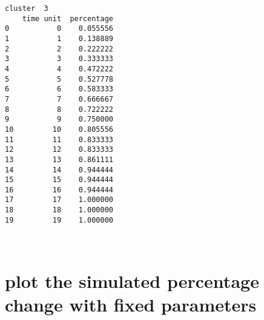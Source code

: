 \documentclass[11pt]{article}
\begin{document}
\begin{Verbatim}[commandchars=\\\{\}]
cluster  3
    time unit  percentage
0           0    0.055556
1           1    0.138889
2           2    0.222222
3           3    0.333333
4           4    0.472222
5           5    0.527778
6           6    0.583333
7           7    0.666667
8           8    0.722222
9           9    0.750000
10         10    0.805556
11         11    0.833333
12         12    0.833333
13         13    0.861111
14         14    0.944444
15         15    0.944444
16         16    0.944444
17         17    1.000000
18         18    1.000000
19         19    1.000000

    \end{Verbatim}

    \begin{center}
    \end{center}
    { \hspace*{\fill} \\}
    
    \hypertarget{plot-the-simulated-percentage-change-with-fixed-parameters}{%
\section{plot the simulated percentage change with fixed
parameters}\label{plot-the-simulated-percentage-change-with-fixed-parameters}}
\end{document}

